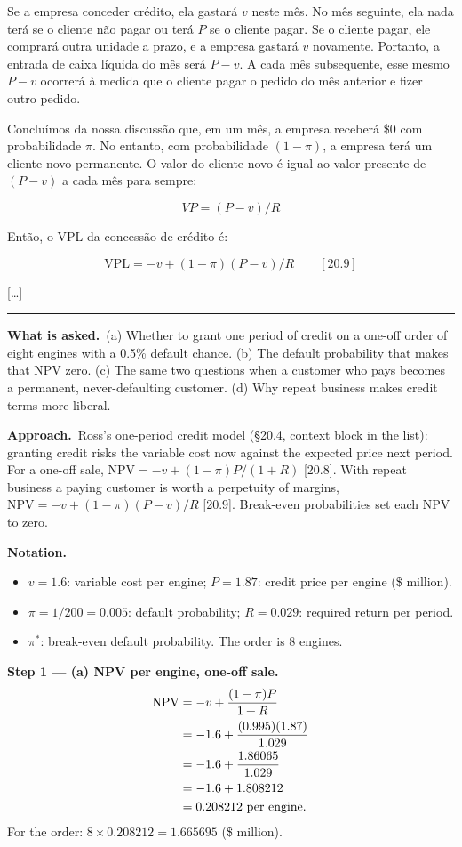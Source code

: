 \documentclass[11pt,a4paper]{article}
\newcommand{\notation}{\par\noindent\textbf{Notation.}}
\newcommand{\step}[2]{\par\medskip\noindent\textbf{Step #1 --- #2.}~}
\newcommand{\asked}{\par\medskip\noindent\textbf{What is asked.}~}
\newcommand{\approach}{\par\smallskip\noindent\textbf{Approach.}~}
\newcommand{\stmtend}{\par\endgroup\nopagebreak\noindent\rule{\linewidth}{0.4pt}\par\medskip}
\begin{document}
Se a empresa conceder crédito, ela gastará \(v\) neste mês. No mês seguinte, ela nada terá se o
cliente não pagar ou terá \(P\) se o cliente pagar. Se o cliente pagar, ele comprará outra unidade a
prazo, e a empresa gastará \(v\) novamente. Portanto, a entrada de caixa líquida do mês será
\(P - v\). A cada mês subsequente, esse mesmo \(P - v\) ocorrerá à medida que o cliente pagar o
pedido do mês anterior e fizer outro pedido.

Concluímos da nossa discussão que, em um mês, a empresa receberá \$0 com probabilidade \(\pi\). No
entanto, com probabilidade \((1 - \pi)\), a empresa terá um cliente novo permanente. O valor do
cliente novo é igual ao valor presente de \((P - v)\) a cada mês para sempre:

\[VP = (P - v)/R\]

Então, o VPL da concessão de crédito é:

\[\text{VPL} = -v + (1 - \pi)(P - v)/R \qquad [20.9]\]

{[}\ldots{]}
\stmtend

\asked (a) Whether to grant one period of credit on a one-off order of eight engines with a 0.5\%
default chance. (b) The default probability that makes that NPV zero. (c) The same two questions
when a customer who pays becomes a permanent, never-defaulting customer. (d) Why repeat business
makes credit terms more liberal.

\approach Ross's one-period credit model (\S20.4, context block in the list): granting credit
risks the variable cost now against the expected price next period. For a one-off sale,
$\text{NPV} = -v + (1-\pi)P/(1+R)$ [20.8]. With repeat business a paying customer is worth a
perpetuity of margins, $\text{NPV} = -v + (1-\pi)(P - v)/R$ [20.9]. Break-even probabilities set
each NPV to zero.

\notation
\begin{itemize}
  \item $v = 1.6$: variable cost per engine; $P = 1.87$: credit price per engine (\$ million).
  \item $\pi = 1/200 = 0.005$: default probability; $R = 0.029$: required return per period.
  \item $\pi^*$: break-even default probability. The order is 8 engines.
\end{itemize}

\step{1}{(a) NPV per engine, one-off sale}
\begin{align}
  \text{NPV} &= -v + \frac{(1-\pi)P}{1+R} \label{r5be10-npv}\\
  &= -1.6 + \frac{(0.995)(1.87)}{1.029} \notag\\
  &= -1.6 + \frac{1.86065}{1.029} \notag\\
  &= -1.6 + 1.808212 \notag\\
  &= 0.208212 \ \text{per engine}. \notag
\end{align}
For the order: $8 \times 0.208212 = 1.665695$ (\$ million).
\end{document}
